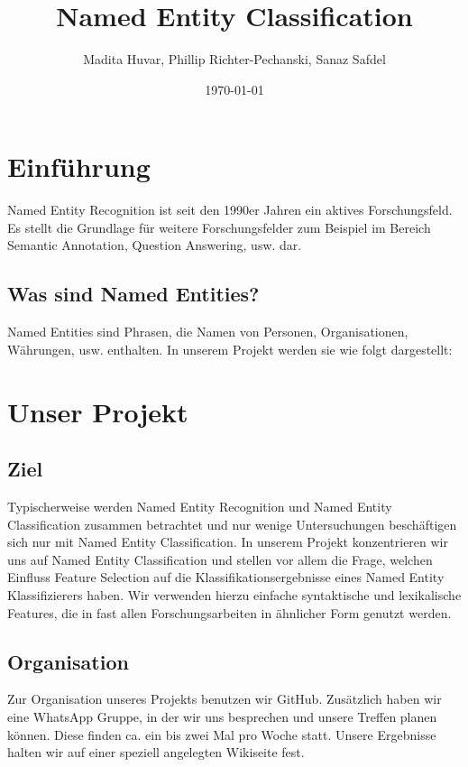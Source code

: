 \documentclass[a4paper, 11pt]{article}
\title{Named Entity Classification}
\author{Madita Huvar, Phillip Richter-Pechanski, Sanaz Safdel}
\date{\today}
\begin{document}
\maketitle
\newpage
\tableofcontents
\newpage
\section{Einführung}
Named Entity Recognition ist seit den 1990er Jahren ein aktives Forschungsfeld. Es stellt die Grundlage für weitere Forschungsfelder zum Beispiel im Bereich Semantic Annotation, Question Answering, usw. dar.
\subsection{Was sind Named Entities?}
Named Entities sind Phrasen, die Namen von Personen, Organisationen, Währungen, usw. enthalten. In unserem Projekt werden sie wie folgt dargestellt:
\section{Unser Projekt}
\subsection{Ziel}
Typischerweise werden Named Entity Recognition und Named Entity Classification zusammen betrachtet und nur wenige Untersuchungen beschäftigen sich nur mit Named Entity Classification. In unserem Projekt konzentrieren wir uns auf Named Entity Classification und stellen vor allem die Frage, welchen Einfluss Feature Selection auf die Klassifikationsergebnisse eines Named Entity Klassifizierers haben. Wir verwenden hierzu einfache syntaktische und lexikalische Features, die in fast allen Forschungsarbeiten in ähnlicher Form genutzt werden.
\subsection{Organisation}
Zur Organisation unseres Projekts benutzen wir GitHub. Zusätzlich haben wir eine WhatsApp Gruppe, in der wir uns besprechen und unsere Treffen planen können. Diese finden ca. ein bis zwei Mal pro Woche statt. Unsere Ergebnisse halten wir auf einer speziell angelegten Wikiseite fest. 
\end{document}
